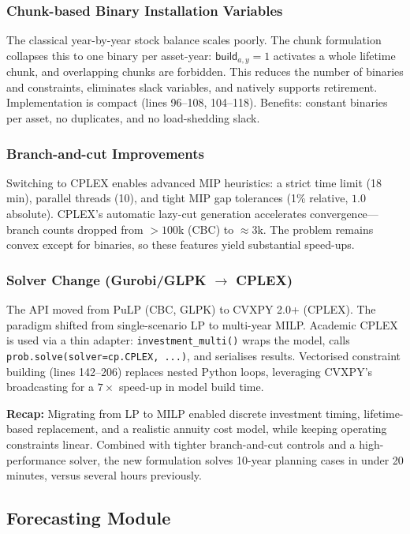 \subsubsection{Chunk-based Binary Installation Variables}

The classical year-by-year stock balance scales poorly. The chunk formulation collapses this to one binary per asset-year: $\textsf{build}_{a,y}=1$ activates a whole lifetime chunk, and overlapping chunks are forbidden. This reduces the number of binaries and constraints, eliminates slack variables, and natively supports retirement. Implementation is compact (lines 96--108, 104--118). Benefits: constant binaries per asset, no duplicates, and no load-shedding slack.

\subsubsection{Branch-and-cut Improvements}

Switching to CPLEX enables advanced MIP heuristics: a strict time limit (18 min), parallel threads (10), and tight MIP gap tolerances (1\% relative, $1.0$ absolute). CPLEX's automatic lazy-cut generation accelerates convergence---branch counts dropped from $>100$k (CBC) to $\approx 3$k. The problem remains convex except for binaries, so these features yield substantial speed-ups.

\subsubsection{Solver Change (Gurobi/GLPK $\rightarrow$ CPLEX)}

The API moved from PuLP (CBC, GLPK) to CVXPY 2.0+ (CPLEX). The paradigm shifted from single-scenario LP to multi-year MILP. Academic CPLEX is used via a thin adapter: \texttt{investment\_multi()} wraps the model, calls \texttt{prob.solve(solver=cp.CPLEX, ...)}, and serialises results. Vectorised constraint building (lines 142--206) replaces nested Python loops, leveraging CVXPY's broadcasting for a $7\times$ speed-up in model build time.

\textbf{Recap:} Migrating from LP to MILP enabled discrete investment timing, lifetime-based replacement, and a realistic annuity cost model, while keeping operating constraints linear. Combined with tighter branch-and-cut controls and a high-performance solver, the new formulation solves 10-year planning cases in under 20 minutes, versus several hours previously.

\subsection{Forecasting Module}

